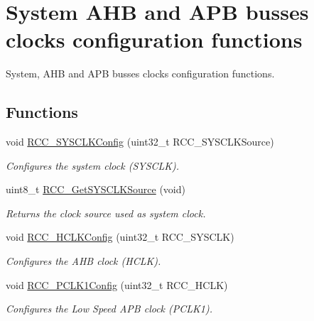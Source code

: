 \hypertarget{group___r_c_c___group2}{}\section{System A\+HB and A\+PB busses clocks configuration functions}
\label{group___r_c_c___group2}


System, A\+HB and A\+PB busses clocks configuration functions.  


\subsection*{Functions}
\begin{DoxyCompactItemize}
\item 
void \mbox{\hyperlink{group___r_c_c___group2_ga3551a36a8f0a3dc96a74d6b939048337}{R\+C\+C\+\_\+\+S\+Y\+S\+C\+L\+K\+Config}} (uint32\+\_\+t R\+C\+C\+\_\+\+S\+Y\+S\+C\+L\+K\+Source)
\begin{DoxyCompactList}\small\item\em Configures the system clock (S\+Y\+S\+C\+LK). \end{DoxyCompactList}\item 
uint8\+\_\+t \mbox{\hyperlink{group___r_c_c___group2_gaaeb32311c208b2a980841c9c884a41ea}{R\+C\+C\+\_\+\+Get\+S\+Y\+S\+C\+L\+K\+Source}} (void)
\begin{DoxyCompactList}\small\item\em Returns the clock source used as system clock. \end{DoxyCompactList}\item 
void \mbox{\hyperlink{group___r_c_c___group2_ga9d0aec72e236c6cdf3a3a82dfb525491}{R\+C\+C\+\_\+\+H\+C\+L\+K\+Config}} (uint32\+\_\+t R\+C\+C\+\_\+\+S\+Y\+S\+C\+LK)
\begin{DoxyCompactList}\small\item\em Configures the A\+HB clock (H\+C\+LK). \end{DoxyCompactList}\item 
void \mbox{\hyperlink{group___r_c_c___group2_ga448137346d4292985d4e7a61dd1a824f}{R\+C\+C\+\_\+\+P\+C\+L\+K1\+Config}} (uint32\+\_\+t R\+C\+C\+\_\+\+H\+C\+LK)
\begin{DoxyCompactList}\small\item\em Configures the Low Speed A\+PB clock (P\+C\+L\+K1). \end{DoxyCompactList}\item 

\end{DoxyCompactItemize}
